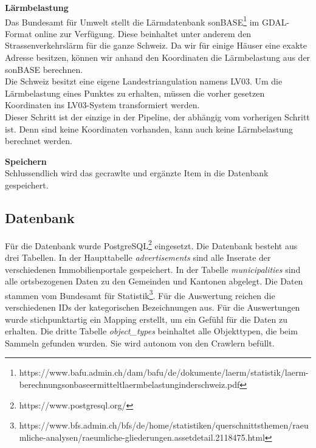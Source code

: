 %
\textbf{Lärmbelastung}\\
Das Bundesamt für Umwelt stellt die Lärmdatenbank sonBASE\footnote{https://www.bafu.admin.ch/dam/bafu/de/dokumente/laerm/statistik/laerm-berechnungsonbaseermitteltlaermbelastunginderschweiz.pdf} im GDAL-Format online zur Verfügung. Diese beinhaltet unter anderem den Strassenverkehrslärm für die ganze Schweiz. Da wir für einige Häuser eine exakte Adresse besitzen, können wir anhand den Koordinaten die Lärmbelastung aus der \mbox{sonBASE} berechnen.\\
Die Schweiz besitzt eine eigene Landestriangulation namens LV03. Um die Lärmbelastung eines Punktes zu erhalten, müssen die vorher gesetzen Koordinaten ins LV03-System transformiert werden.\\
Dieser Schritt ist der einzige in der Pipeline, der abhängig vom vorherigen Schritt ist. Denn sind keine Koordinaten vorhanden, kann auch keine Lärmbelastung berechnet werden.

\textbf{Speichern}\\
Schlussendlich wird das gecrawlte und ergänzte Item in die Datenbank gespeichert.

\subsection{Datenbank}
Für die Datenbank wurde PostgreSQL\footnote{https://www.postgresql.org/} eingesetzt. Die Datenbank besteht aus drei Tabellen. In der Haupttabelle \textit{advertisements} sind alle Inserate der verschiedenen Immobilienportale gespeichert. In der Tabelle \textit{municipalities} sind alle ortsbezogenen Daten zu den Gemeinden und Kantonen abgelegt. Die Daten stammen vom Bundesamt für Statistik\footnote{https://www.bfs.admin.ch/bfs/de/home/statistiken/querschnittsthemen/raeumliche-analysen/raeumliche-gliederungen.assetdetail.2118475.html}. Für die Auswertung reichen die verschiedenen IDs der kategorischen Bezeichnungen aus. Für die Auswertungen wurde stichpunktartig ein Mapping erstellt, um ein Gefühl für die Daten zu erhalten.
Die dritte Tabelle \textit{object\_types} beinhaltet alle Objekttypen, die beim Sammeln gefunden wurden. Sie wird autonom von den Crawlern befüllt.

